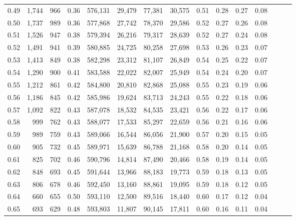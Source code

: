 \begin{tabular}{rrrrrrrrrrrrrrr}
0.49 &   1,744 &    966 &  0.36 &  576,131 &   29,479 &   77,381 &   30,575 &  0.51 &  0.28 &  0.27 &      0.08 \\
0.50 &   1,737 &    989 &  0.36 &  577,868 &   27,742 &   78,370 &   29,586 &  0.52 &  0.27 &  0.26 &      0.08 \\
0.51 &   1,526 &    947 &  0.38 &  579,394 &   26,216 &   79,317 &   28,639 &  0.52 &  0.27 &  0.24 &      0.08 \\
0.52 &   1,491 &    941 &  0.39 &  580,885 &   24,725 &   80,258 &   27,698 &  0.53 &  0.26 &  0.23 &      0.07 \\
0.53 &   1,413 &    849 &  0.38 &  582,298 &   23,312 &   81,107 &   26,849 &  0.54 &  0.25 &  0.22 &      0.07 \\
0.54 &   1,290 &    900 &  0.41 &  583,588 &   22,022 &   82,007 &   25,949 &  0.54 &  0.24 &  0.20 &      0.07 \\
0.55 &   1,212 &    861 &  0.42 &  584,800 &   20,810 &   82,868 &   25,088 &  0.55 &  0.23 &  0.19 &      0.06 \\
0.56 &   1,186 &    845 &  0.42 &  585,986 &   19,624 &   83,713 &   24,243 &  0.55 &  0.22 &  0.18 &      0.06 \\
0.57 &   1,092 &    822 &  0.43 &  587,078 &   18,532 &   84,535 &   23,421 &  0.56 &  0.22 &  0.17 &      0.06 \\
0.58 &     999 &    762 &  0.43 &  588,077 &   17,533 &   85,297 &   22,659 &  0.56 &  0.21 &  0.16 &      0.06 \\
0.59 &     989 &    759 &  0.43 &  589,066 &   16,544 &   86,056 &   21,900 &  0.57 &  0.20 &  0.15 &      0.05 \\
0.60 &     905 &    732 &  0.45 &  589,971 &   15,639 &   86,788 &   21,168 &  0.58 &  0.20 &  0.14 &      0.05 \\
0.61 &     825 &    702 &  0.46 &  590,796 &   14,814 &   87,490 &   20,466 &  0.58 &  0.19 &  0.14 &      0.05 \\
0.62 &     848 &    693 &  0.45 &  591,644 &   13,966 &   88,183 &   19,773 &  0.59 &  0.18 &  0.13 &      0.05 \\
0.63 &     806 &    678 &  0.46 &  592,450 &   13,160 &   88,861 &   19,095 &  0.59 &  0.18 &  0.12 &      0.05 \\
0.64 &     660 &    655 &  0.50 &  593,110 &   12,500 &   89,516 &   18,440 &  0.60 &  0.17 &  0.12 &      0.04 \\
0.65 &     693 &    629 &  0.48 &  593,803 &   11,807 &   90,145 &   17,811 &  0.60 &  0.16 &  0.11 &      0.04 \\

\end{tabular}
